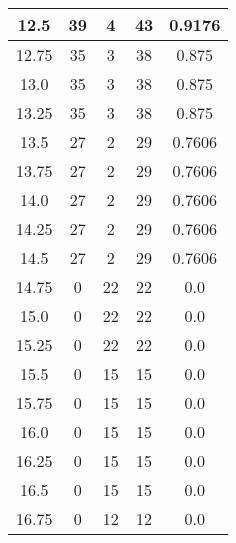 \documentclass[letterpaper, 12pt]{article}
\begin{document}
\begin{longtable}{|c|c|c|c|c|}
12.5 & 39 & 4 & 43 & 0.9176 \\
\hline
12.75 & 35 & 3 & 38 & 0.875 \\
\hline
13.0 & 35 & 3 & 38 & 0.875 \\
\hline
13.25 & 35 & 3 & 38 & 0.875 \\
\hline
13.5 & 27 & 2 & 29 & 0.7606 \\
\hline
13.75 & 27 & 2 & 29 & 0.7606 \\
\hline
14.0 & 27 & 2 & 29 & 0.7606 \\
\hline
14.25 & 27 & 2 & 29 & 0.7606 \\
\hline
14.5 & 27 & 2 & 29 & 0.7606 \\
\hline
14.75 & 0 & 22 & 22 & 0.0 \\
\hline
15.0 & 0 & 22 & 22 & 0.0 \\
\hline
15.25 & 0 & 22 & 22 & 0.0 \\
\hline
15.5 & 0 & 15 & 15 & 0.0 \\
\hline
15.75 & 0 & 15 & 15 & 0.0 \\
\hline
16.0 & 0 & 15 & 15 & 0.0 \\
\hline
16.25 & 0 & 15 & 15 & 0.0 \\
\hline
16.5 & 0 & 15 & 15 & 0.0 \\
\hline
16.75 & 0 & 12 & 12 & 0.0 \\
\hline
\end{longtable}
\end{document}
